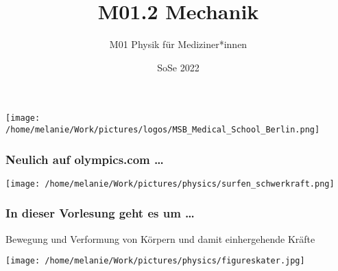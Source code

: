 \documentclass{beamer}
\title[M01.2 Mechanik]{M01.2 Mechanik}
\author[melanie.stefan@medicalschool-berlin.de]{M01 Physik für Mediziner*innen}
\institute[]{Prof. Melanie Stefan - melanie.stefan@medcialschool-berlin.de}
\date{SoSe 2022}
\begin{document}
 
\begin{frame}

 \maketitle 

 
\vfill

\texttt{[image: /home/melanie/Work/pictures/logos/MSB\_Medical\_School\_Berlin.png]}

\end{frame} 

\begin{frame}
\frametitle{Neulich auf  olympics.com \dots}

\begin{center}
\texttt{[image: /home/melanie/Work/pictures/physics/surfen\_schwerkraft.png]}
\end{center}

 
\end{frame}

\begin{frame}
\frametitle{In dieser Vorlesung geht es um \dots}

Bewegung und Verformung von Körpern und damit einhergehende Kräfte

\begin{center}
\texttt{[image: /home/melanie/Work/pictures/physics/figureskater.jpg]}
\end{center}

 
\end{frame}



 
\end{document}
